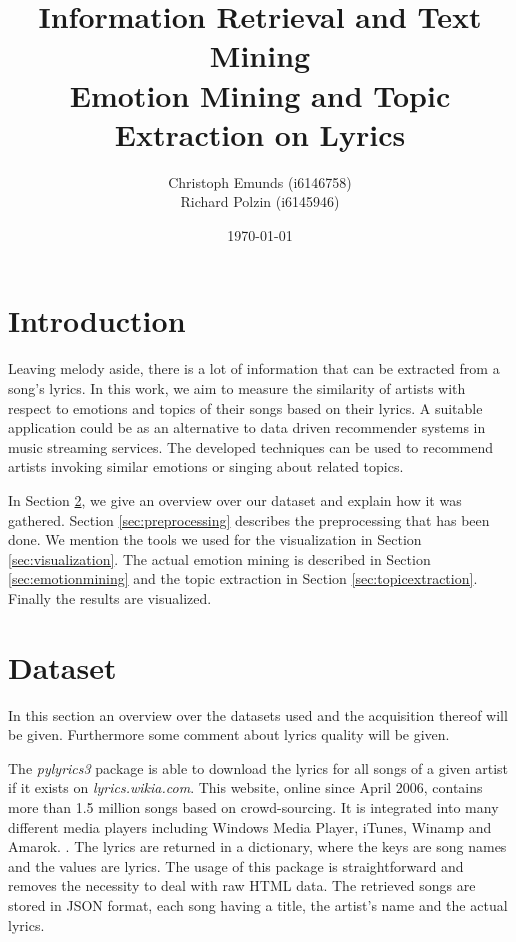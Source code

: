 \documentclass[10pt,a4paper]{article}
\author{Christoph Emunds (i6146758)\\Richard Polzin (i6145946)}
\title{Information Retrieval and Text Mining\\Emotion Mining and Topic Extraction on Lyrics}
\date{\today}
\begin{document}
	\maketitle
	
	\tableofcontents
	
	\section{Introduction}
	\label{sec:introduction}
	Leaving melody aside, there is a lot of information that can be extracted from a song's lyrics. In this work, we aim to measure the similarity of artists with respect to emotions and topics of their songs based on their lyrics. A suitable application could be as an alternative to data driven recommender systems in music streaming services. The developed techniques can be used to recommend artists invoking similar emotions or singing about related topics.
	
	In Section \ref{sec:dataset}, we give an overview over our dataset and explain how it was gathered. Section \ref{sec:preprocessing} describes the preprocessing that has been done. We mention the tools we used for the visualization in Section \ref{sec:visualization}. The actual emotion mining is described in Section \ref{sec:emotionmining} and the topic extraction in Section \ref{sec:topicextraction}. Finally the results are visualized.

	\section{Dataset}
	\label{sec:dataset}
	In this section an overview over the datasets used and the acquisition thereof will be given. Furthermore some comment about lyrics quality will be given.

	The \textit{pylyrics3} package \cite{pylyrics3} is able to download the lyrics for all songs of a given artist if it exists on \textit{lyrics.wikia.com}. This website, online since April 2006, contains more than 1.5 million songs based on crowd-sourcing. It is integrated into many different media players including Windows Media Player, iTunes, Winamp and Amarok. \cite{lyricwikia}.  
	The lyrics are returned in a dictionary, where the keys are song names and the values are lyrics. The usage of this package is straightforward and removes the necessity to deal with raw HTML data. The retrieved songs are stored in JSON format, each song having a title, the artist's name and the actual lyrics.
	
\end{document}
